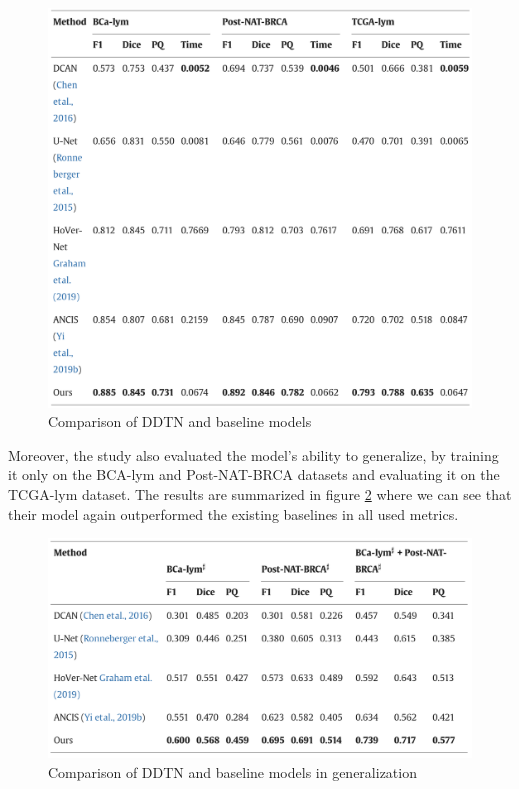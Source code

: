 \begin{figure}[H]
    \begin{centering}
    \includegraphics[width=14cm]{assets/images/rw-ddtn-results.png}
    \par\end{centering}
    \caption{Comparison of DDTN and baseline models}
    \label{fig:rw-ddtn-results}
\end{figure}

Moreover, the study also evaluated the model's ability to generalize, by training it only on the BCA-lym and Post-NAT-BRCA datasets and evaluating it on the TCGA-lym dataset. The results are summarized in figure \ref{fig:rw-ddtn-generalize} where we can see that their model again outperformed the existing baselines in all used metrics.

\begin{figure}[H]
    \begin{centering}
    \includegraphics[width=14cm]{assets/images/rw-ddtn-generalize.png}
    \par\end{centering}
    \caption{Comparison of DDTN and baseline models in generalization}
    \label{fig:rw-ddtn-generalize}
\end{figure}

